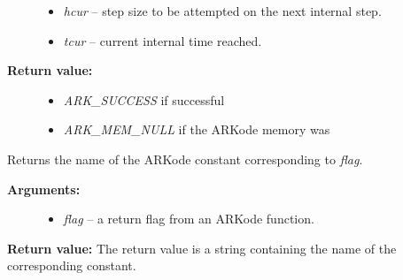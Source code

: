 \documentclass[letterpaper,10pt,english]{sphinxmanual}
\begin{document}
\begin{fulllineitems}
\begin{description}
\begin{itemize}
\item {} 
\emph{hcur} -- step size to be attempted on the next internal step.

\item {} 
\emph{tcur} -- current internal time reached.

\end{itemize}

\item[{\textbf{Return value:}}] \leavevmode\begin{itemize}
\item {} 
\emph{ARK\_SUCCESS} if successful

\item {} 
\emph{ARK\_MEM\_NULL} if the ARKode memory was 

\end{itemize}

\end{description}

\end{fulllineitems}


\begin{fulllineitems}
\label{c_interface/User_callable:c.ARKodeGetReturnFlagName}
Returns the name of the ARKode constant corresponding to \emph{flag}.
\begin{description}
\item[{\textbf{Arguments:}}] \leavevmode\begin{itemize}
\item {} 
\emph{flag} -- a return flag from an ARKode function.

\end{itemize}

\end{description}

\textbf{Return value:}
The return value is a string containing the name of
the corresponding constant.

\end{fulllineitems}
\end{document}

